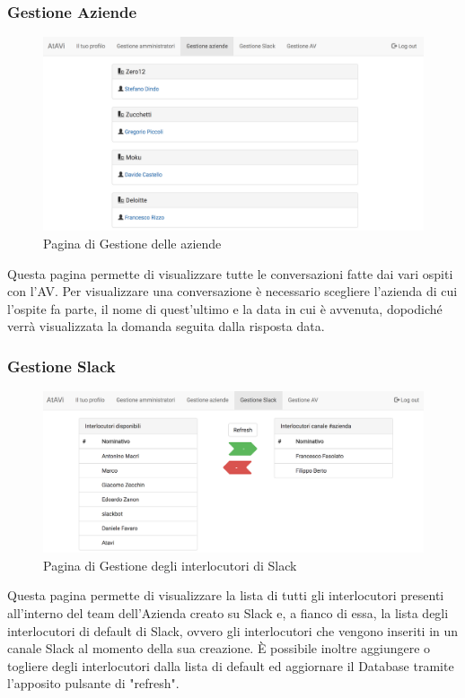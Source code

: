 \documentclass[../ManualeUtente_v2.0.0.tex]{subfiles}
\begin{document}
	\subsubsection{Gestione Aziende}
	\begin{figure}[!h]
		\centering
		\includegraphics[scale=0.25]{Screenshot/admin-manageFirms.png}
		\caption{Pagina di Gestione delle aziende}
	\end{figure}
	Questa pagina permette di visualizzare tutte le conversazioni fatte dai vari ospiti con l'\gls{AV}. Per visualizzare una conversazione è necessario scegliere l'azienda di cui l'ospite fa parte, il nome di quest'ultimo e la data in cui è avvenuta, dopodiché verrà visualizzata la domanda seguita dalla risposta data.
	
	\newpage
	\subsubsection{Gestione Slack}
	\begin{figure}[!h]
		\centering
		\includegraphics[scale=0.25]{Screenshot/admin-manageSlack.png}
		\caption{Pagina di Gestione degli interlocutori di Slack}
	\end{figure}
	Questa pagina permette di visualizzare la lista di tutti gli interlocutori presenti all'interno del team dell'Azienda creato su Slack e, a fianco di essa, la lista degli interlocutori di default di Slack, ovvero gli interlocutori che vengono inseriti in un canale Slack al momento della sua creazione.
	\newline
	È possibile inoltre aggiungere o togliere degli interlocutori dalla lista di default ed aggiornare il Database tramite l'apposito pulsante di "refresh".
\end{document}
